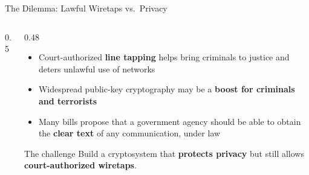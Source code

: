 \documentclass[aspectratio=169,11pt,xcolor={table}]{beamer}
\begin{document}
\begin{frame}{The Dilemma: Lawful Wiretaps vs.\ Privacy}
  \begin{columns}[c]
    \begin{column}{0.5\textwidth}
      \centering
    \end{column}
    \begin{column}{0.48\textwidth}
      \begin{itemize}\small\setlength{\itemsep}{4pt}
        \item Court-authorized \textbf{line tapping} helps bring criminals to justice and deters unlawful use of networks
        \item Widespread public-key cryptography may be a \textbf{boost for criminals and terrorists}
        \item Many bills propose that a government agency should be able to obtain the \textbf{clear text} of any communication, under law
      \end{itemize}
      \begin{block}{The challenge}
        \small Build a cryptosystem that \textbf{protects privacy} but still allows \textbf{court-authorized wiretaps}.
      \end{block}
    \end{column}
  \end{columns}
\end{frame}
\end{document}
